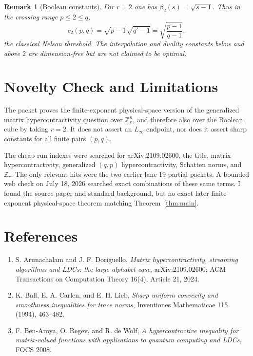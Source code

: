 \documentclass[11pt]{article}
\newtheorem{remark}{Remark}
\newcommand{\Z}{\mathbb Z}
\begin{document}
\begin{remark}[Boolean constants]
For $r=2$ one has $\beta_2(s)=\sqrt{s-1}$. Thus in the crossing range
$p\leq2\leq q$,
\[
  c_2(p,q)=\sqrt{p-1}\sqrt{q'-1}
  =
  \sqrt{\frac{p-1}{q-1}},
\]
the classical Nelson threshold. The interpolation and duality constants below
and above $2$ are dimension-free but are not claimed to be optimal.
\end{remark}

\section*{Novelty Check and Limitations}

The packet proves the finite-exponent physical-space version of the generalized
matrix hypercontractivity question over $\Z_r^n$, and therefore also over the
Boolean cube by taking $r=2$. It does not assert an $L_\infty$ endpoint, nor
does it assert sharp constants for all finite pairs $(p,q)$.

The cheap run indexes were searched for arXiv:2109.02600, the title, matrix
hypercontractivity, generalized $(q,p)$ hypercontractivity, Schatten norms, and
$\Z_r$. The only relevant hits were the two earlier lane 19 partial packets.
A bounded web check on July 18, 2026 searched exact combinations of these same
terms. I found the source paper and standard background, but no exact later
finite-exponent physical-space theorem matching Theorem~\ref{thm:main}.

\section*{References}

\begin{enumerate}
\item S. Arunachalam and J. F. Doriguello,
\emph{Matrix hypercontractivity, streaming algorithms and LDCs: the large
alphabet case}, arXiv:2109.02600; ACM Transactions on Computation Theory
16(4), Article 21, 2024.
\item K. Ball, E. A. Carlen, and E. H. Lieb,
\emph{Sharp uniform convexity and smoothness inequalities for trace norms},
Inventiones Mathematicae 115 (1994), 463--482.
\item F. Ben-Aroya, O. Regev, and R. de Wolf,
\emph{A hypercontractive inequality for matrix-valued functions with
applications to quantum computing and LDCs}, FOCS 2008.
\end{enumerate}
\end{document}
